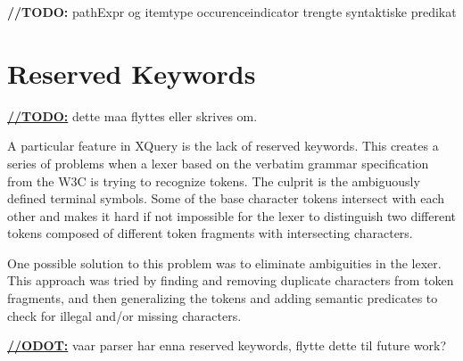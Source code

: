 \textbf{\LARGE //TODO:} pathExpr og itemtype occurenceindicator trengte syntaktiske predikat

\section{Reserved Keywords}

\underline{\textbf{\LARGE //TODO:}} dette maa flyttes eller skrives om.

A particular feature in XQuery is the lack of reserved keywords. This creates a
series of problems when a lexer based on the verbatim grammar specification from
the W3C is trying to recognize tokens. The culprit is the ambiguously defined
terminal symbols. Some of the base character tokens intersect with each other
and makes it hard if not impossible for the lexer to distinguish two different
tokens composed of different token fragments with intersecting characters.

One possible solution to this problem was to eliminate ambiguities in the lexer.
This approach was tried by finding and removing duplicate characters from token
fragments, and then generalizing the tokens and adding semantic predicates to
check for illegal and/or missing characters.

\underline{\textbf{\LARGE //ODOT:}} vaar parser har enna reserved keywords, flytte dette til future work?




